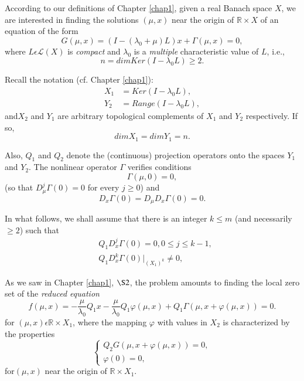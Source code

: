 According to our definitions of Chapter \ref{chap1}, given a real
Banach space $X$, we are interested in finding the solutions $(\mu, x)$
near the origin of $\mathbb{R} \times X$ of an equation of the form
\begin{equation*}
G(\mu, x) = (I - (\lambda_{0} + \mu)L) x + \Gamma (\mu, x) = 0,
\tag{2.1}\label{chap3-eq2.1} 
\end{equation*}
where $L \epsilon \mathscr{L}(X)$ is {\em compact} and $\lambda_{0}$
is a {\em multiple} characteristic value of $L$, i.e.,
$$
n = dim Ker (I - \lambda_{0} L) \geq 2.
$$

Recall the notation (cf. Chapter \ref{chap1}):
\begin{align*}
X_{1} & = Ker (I - \lambda_{0}L),\tag{2.2}\label{chap3-eq2.2}\\
Y_{2} & = Range (I - \lambda_{0}L),\tag{2.3}\label{chap3-eq2.3}
\end{align*}
and\pageoriginale $X_{2}$ and $Y_{1}$ are arbitrary topological
complements of $X_{1}$ and $Y_{2}$ respectively. If so,
\begin{equation*}
dim X_{1} = dim Y_{1} = n.\tag{2.4}\label{chap3-eq2.4}
\end{equation*}

Also, $Q_{1}$ and $Q_{2}$ denote the (continuous) projection operators
onto the spaces $Y_{1}$ and $Y_{2}$. The nonlinear operator $\Gamma$
verifies conditions
\begin{equation*}
\Gamma(\mu, 0) = 0,\tag{2.5}\label{chap3-eq2.5}
\end{equation*}
(so that $D_{\mu}^{j} \Gamma(0) = 0$ for every $j \geq 0$) and
\begin{equation*}
D_{x}\Gamma(0) = D_{\mu}D_{x}\Gamma(0) = 0.\tag{2.6}\label{chap3-eq2.6}
\end{equation*}

In what follows, we shall assume that there is an integer $k \leq m$
(and necessarily $\geq 2$) such that
\begin{align*}
& Q_{1}D_{x}^{j}\Gamma(0) = 0, 0 \leq j \leq k-1,\\
& Q_{1}D_{x}^{k}\Gamma(0) |_{(X_{1})^{k}} \neq 0,\tag{2.7}\label{chap3-eq2.7}
\end{align*}

As we saw in Chapter \ref{chap1}, $\S 2$, the problem amounts to
finding the local zero set of the {\em reduced equation}
\begin{equation*}
f(\mu, x) = -\frac{\mu}{\lambda_{0}} Q_{1} x - \frac{\mu}{\lambda_{0}}
Q_{1} \varphi(\mu, x) + Q_{1}\Gamma(\mu, x + \varphi(\mu, x)) =
0.\tag{2.8}\label{chap3-eq2.8} 
\end{equation*}
for $(\mu, x) \epsilon \mathbb{R} \times X_{1}$, where the mapping
$\varphi$ with values in $X_{2}$ is characterized by the properties
\begin{equation*}
\begin{cases}
Q_{2}G(\mu, x + \varphi(\mu, x)) = 0,\\
\varphi(0) = 0,
\end{cases}\tag{2.9}\label{chap3-eq2.9}
\end{equation*}
for\pageoriginale $(\mu, x)$ near the origin of $\mathbb{R} \times
X_{1}$.

